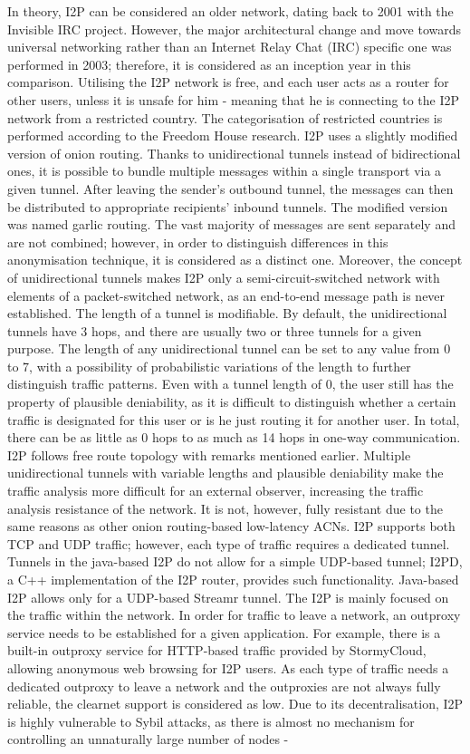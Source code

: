 In theory, I2P can be considered an older network, dating back to 2001 with the Invisible IRC project. However, the major architectural change and move towards universal networking rather than an Internet Relay Chat (IRC) specific one was performed in 2003; therefore, it is considered as an inception year in this comparison. Utilising the I2P network is free, and each user acts as a router for other users, unless it is unsafe for him - meaning that he is connecting to the I2P network from a restricted country. The categorisation of restricted countries is performed according to the Freedom House research. I2P uses a slightly modified version of onion routing. Thanks to unidirectional tunnels instead of bidirectional ones, it is possible to bundle multiple messages within a single transport via a given tunnel. After leaving the sender’s outbound tunnel, the messages can then be distributed to appropriate recipients’ inbound tunnels. The modified version was named garlic routing. The vast majority of messages are sent separately and are not combined; however, in order to distinguish differences in this anonymisation technique, it is considered as a distinct one. Moreover, the concept of unidirectional tunnels makes I2P only a semi-circuit-switched network with elements of a packet-switched network, as an end-to-end message path is never established. The length of a tunnel is modifiable. By default, the unidirectional tunnels have 3 hops, and there are usually two or three tunnels for a given purpose. The length of any unidirectional tunnel can be set to any value from 0 to 7, with a possibility of probabilistic variations of the length to further distinguish traffic patterns. Even with a tunnel length of 0, the user still has the property of plausible deniability, as it is difficult to distinguish whether a certain traffic is designated for this user or is he just routing it for another user. In total, there can be as little as 0 hops to as much as 14 hops in one-way communication. I2P follows free route topology with remarks mentioned earlier. Multiple unidirectional tunnels with variable lengths and plausible deniability make the traffic analysis more difficult for an external observer, increasing the traffic analysis resistance of the network. It is not, however, fully resistant due to the same reasons as other onion routing-based low-latency ACNs. I2P supports both TCP and UDP traffic; however, each type of traffic requires a dedicated tunnel. Tunnels in the java-based I2P do not allow for a simple UDP-based tunnel; I2PD, a C++ implementation of the I2P router, provides such functionality. Java-based I2P allows only for a UDP-based Streamr tunnel. The I2P is mainly focused on the traffic within the network. In order for traffic to leave a network, an outproxy service needs to be established for a given application. For example, there is a built-in outproxy service for HTTP-based traffic provided by StormyCloud, allowing anonymous web browsing for I2P users. As each type of traffic needs a dedicated outproxy to leave a network and the outproxies are not always fully reliable, the clearnet support is considered as low. Due to its decentralisation, I2P is highly vulnerable to Sybil attacks, as there is almost no mechanism for controlling an unnaturally large number of nodes - 